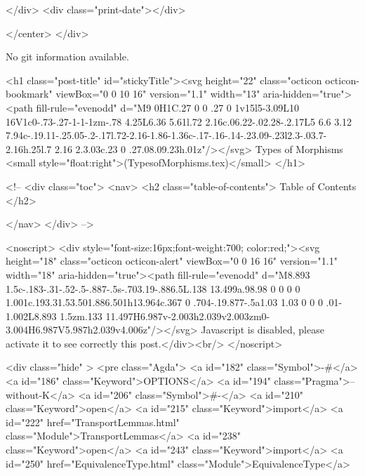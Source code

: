          
        </div>
        <div class="print-date"></div>
        
        
    </center>
  </div>

  
  No git information available.
  

  <h1 class="post-title" id="stickyTitle"><svg height="22" class="octicon octicon-bookmark" viewBox="0 0 10 16" version="1.1" width="13" aria-hidden="true"><path fill-rule="evenodd" d="M9 0H1C.27 0 0 .27 0 1v15l5-3.09L10 16V1c0-.73-.27-1-1-1zm-.78 4.25L6.36 5.61l.72 2.16c.06.22-.02.28-.2.17L5 6.6 3.12 7.94c-.19.11-.25.05-.2-.17l.72-2.16-1.86-1.36c-.17-.16-.14-.23.09-.23l2.3-.03.7-2.16h.25l.7 2.16 2.3.03c.23 0 .27.08.09.23h.01z"/></svg> Types of Morphisms <small style="float:right">(TypesofMorphisms.tex)</small>
  </h1>

  <!-- 
  <div class="toc">
    <nav>
    <h2 class="table-of-contents"> Table of Contents </h2>
      

    </nav>
  </div>
   -->

  <noscript>
  <div style="font-size:16px;font-weight:700; color:red;"><svg height="18" class="octicon octicon-alert" viewBox="0 0 16 16" version="1.1" width="18" aria-hidden="true"><path fill-rule="evenodd" d="M8.893 1.5c-.183-.31-.52-.5-.887-.5s-.703.19-.886.5L.138 13.499a.98.98 0 0 0 0 1.001c.193.31.53.501.886.501h13.964c.367 0 .704-.19.877-.5a1.03 1.03 0 0 0 .01-1.002L8.893 1.5zm.133 11.497H6.987v-2.003h2.039v2.003zm0-3.004H6.987V5.987h2.039v4.006z"/></svg> Javascript is disabled, please activate it to see correctly this post.</div><br/>
  </noscript>

  <div class="hide" >
<pre class="Agda">
<a id="182" class="Symbol">{-#</a> <a id="186" class="Keyword">OPTIONS</a> <a id="194" class="Pragma">--without-K</a> <a id="206" class="Symbol">#-}</a>
<a id="210" class="Keyword">open</a> <a id="215" class="Keyword">import</a> <a id="222" href="TransportLemmas.html" class="Module">TransportLemmas</a>
<a id="238" class="Keyword">open</a> <a id="243" class="Keyword">import</a> <a id="250" href="EquivalenceType.html" class="Module">EquivalenceType</a>

